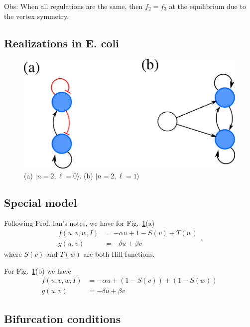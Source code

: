 \documentclass[12pt]{article}
\begin{document}
Obs: When all regulations are the same, then $f_2 = f_3$ at the equilibrium due 
to the vertex symmetry.

\subsection{Realizations in E. coli}

\begin{figure}[H]
    \centering
    \includegraphics[scale=0.5]{figs/n2l0l1_ecoli.png}
    \caption{(a) $|n=2,\ell = 0\rangle$. (b) $|n=2, \ell=1\rangle$}
    \label{fig:fig3_l0l1}
\end{figure}

\subsection{Special model}

Following Prof. Ian's notes, we have for 
Fig.~\ref{fig:fig3_l0l1}(a)
\begin{equation}
    \begin{aligned}
        f(u, v, w, I) &= -\alpha u + 1-S(v) +  T(w)\\
        g(u, v) &= -\delta u + \beta v
    \end{aligned},
\end{equation}
where $S(v)$ and $T(w)$ are both Hill functions.

For Fig.~\ref{fig:fig3_l0l1}(b) we have
\begin{equation}
    \begin{aligned}
        f(u, v, w, I) &= -\alpha u + (1 - S(v)) +  (1-S(w))\\
        g(u, v) &= -\delta u + \beta v
    \end{aligned}
\end{equation}

\subsection{Bifurcation conditions}
\end{document}
